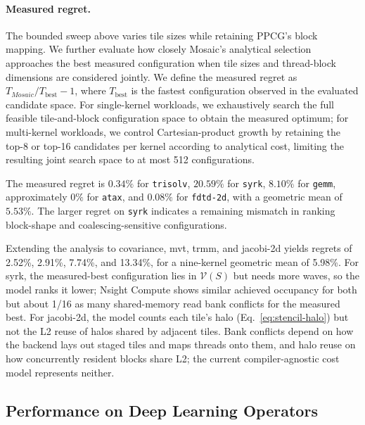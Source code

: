 \documentclass[acmsmall,review,anonymous,screen]{acmart}
\newif\ifrevmarkup %
\DeclareRobustCommand{\revRthree}[1]{\ifrevmarkup{\color{revRthree}\hypersetup{allcolors=revRthree}#1}\else#1\fi} %
\newcommand{\name}{{Mosaic}\xspace}
\providecommand{\DIFaddbegin}{} %
\providecommand{\DIFaddend}{} %
\newcommand{\DIFaddincludegraphics}[2][]{{\color{blue}\fbox{\DIFOincludegraphics[#1]{#2}}}} %
\DeclareRobustCommand{\DIFaddbegin}{\DIFOaddbegin \let\includegraphics\DIFaddincludegraphics} %
\DeclareRobustCommand{\DIFaddend}{\DIFOaddend \let\includegraphics\DIFOincludegraphics} %
\begin{document}
\paragraph{Measured regret.}
The bounded sweep above varies tile sizes while retaining PPCG's block
mapping. We further evaluate how closely \name's analytical selection
approaches the best measured configuration when tile sizes and thread-block
dimensions are considered jointly. We define the measured regret as
\(T_{\name}/T_{\mathrm{best}}-1\), where \(T_{\mathrm{best}}\) is the fastest
configuration observed in the evaluated candidate space. For single-kernel
workloads, we exhaustively search the full feasible tile-and-block
configuration space to obtain the measured optimum; for multi-kernel
workloads, we control Cartesian-product growth by retaining the top-8 or
top-16 candidates per kernel according to analytical cost, limiting the
resulting joint search space to at most 512 configurations.

The measured regret is \(0.34\%\) for \texttt{trisolv}, \(20.59\%\) for
\texttt{syrk}, \(8.10\%\) for \texttt{gemm}, approximately \(0\%\) for
\texttt{atax}, and \(0.08\%\) for \texttt{fdtd-2d}, with a geometric mean
of \(5.53\%\). The larger regret on \texttt{syrk} indicates
a remaining mismatch in ranking block-shape and coalescing-sensitive
configurations.

\DIFaddbegin \revRthree{Extending the analysis to covariance, mvt, trmm, and jacobi-2d yields regrets of 2.52\%, 2.91\%, 7.74\%, and 13.34\%, for a nine-kernel geometric mean of 5.98\%. For syrk, the measured-best configuration lies in $\mathcal{V}(S)$ but needs more waves, so the model ranks it lower; Nsight Compute shows similar achieved occupancy for both but about 1/16 as many shared-memory read bank conflicts for the measured best. For jacobi-2d, the model counts each tile's halo (Eq.~\eqref{eq:stencil-halo}) but not the L2 reuse of halos shared by adjacent tiles. Bank conflicts depend on how the backend lays out staged tiles and maps threads onto them, and halo reuse on how concurrently resident blocks share L2; the current compiler-agnostic cost model represents neither.}

\DIFaddend \subsection{Performance on Deep Learning Operators}
\label{subsec:operators}
\end{document}
